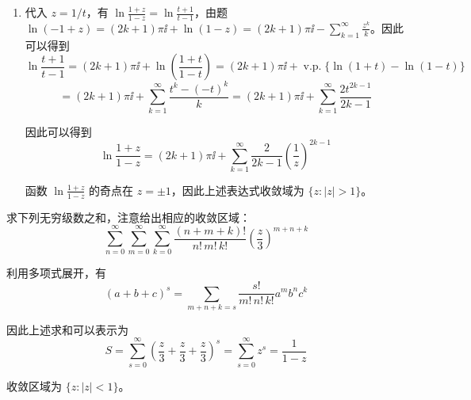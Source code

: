 \begin{question}
\begin{solution}
\begin{enumerate}
其收敛半径为 1。(因为 \(\arctan z\) 在 \(z=\pm \ii\) 处为奇点。)

\item 代入 \(z=1/t\)，有 \(\ln \frac{1+z}{1-z} = \ln \frac{t+1}{t-1}\)，由题 \(\ln (-1+z)=(2k+1) \pi \ii + \ln(1-z)=(2k+1)\pi \ii - \sum_{k=1}^\infty \frac{z^k}{k}\)。因此可以得到
\[
\ln \frac{t+1}{t-1} = (2k+1)\pi \ii + \ln\!\left(\frac{1+t}{1-t}\right)
= (2k+1)\pi \ii + \operatorname{v.p.}\{\ln(1+t) - \ln(1-t)\}
\]
\[
= (2k+1) \pi \ii + \sum_{k=1}^\infty \frac{t^k-(-t)^k}{k}
= (2k+1)\pi \ii + \sum_{k=1}^\infty \frac{2t^{2k-1}}{2k-1}
\]

因此可以得到
\[
\ln \frac{1+z}{1-z} = (2k+1)\pi \ii + \sum_{k=1}^\infty \frac{2}{2k-1} \left(\frac{1}{z}\right)^{2k-1}
\]

函数 \(\ln \frac{1+z}{1-z}\) 的奇点在 \(z=\pm 1\)，因此上述表达式收敛域为 \(\{z:|z|>1\}\)。
\end{enumerate}
\end{solution}
\end{question}

\begin{question}
求下列无穷级数之和，注意给出相应的收敛区域：
\[
\sum_{n=0}^\infty \sum_{m=0}^\infty \sum_{k=0}^\infty \frac{(n+m+k)!}{n!\,m!\,k!} \left(\frac{z}{3}\right)^{m+n+k}
\]
\begin{solution}
利用多项式展开，有
\[
(a+b+c)^s = \sum_{m+n+k=s} \frac{s!}{m!\,n!\,k!} a^m b^n c^k
\]

因此上述求和可以表示为
\[
S = \sum_{s=0}^\infty \left(\frac{z}{3}+\frac{z}{3}+\frac{z}{3}\right)^s
= \sum_{s=0}^\infty z^s = \frac{1}{1-z}
\]

收敛区域为 \(\{z:|z|<1\}\)。
\end{solution}
\end{question}

